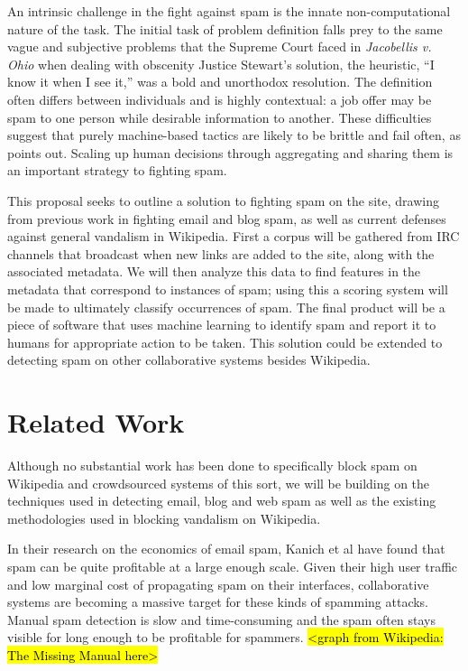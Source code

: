 \documentclass[letterpaper]{sig-alternate}
\begin{document}
An intrinsic challenge in the fight against spam is the innate non-computational nature of the task. The initial task of problem definition falls prey to the same vague and subjective problems that the Supreme Court faced in \emph{Jacobellis v. Ohio} when dealing with obscenity Justice Stewart's solution, the heuristic, ``I know it when I see it,'' was a bold and unorthodox resolution. The definition often differs between individuals and is highly contextual: a job offer may be spam to one person while desirable information to another. These difficulties suggest that purely machine-based tactics are likely to be brittle and fail often, as \cite{collaborative_filtering} points out. Scaling up human decisions through aggregating and sharing them is an important strategy to fighting spam.

This proposal seeks to outline a solution to fighting spam on the site, drawing from previous work in fighting email and blog spam, as well as current defenses against general vandalism in Wikipedia. First a corpus will be gathered from IRC channels that broadcast when new links are added to the site, along with the associated metadata. We will then analyze this data to find features in the metadata that correspond to instances of spam; using this a scoring system will be made to ultimately classify occurrences of spam. The final product will be a piece of software that uses machine learning to identify spam and report it to humans for appropriate action to be taken. This solution could be extended to detecting spam on other collaborative systems besides Wikipedia.

\section{Related Work}
\label{sec:related_work}
Although no substantial work has been done to specifically block spam on Wikipedia and crowdsourced systems of this sort, we will be building on the techniques used in detecting email, blog and web spam as well as the existing methodologies used in blocking vandalism on Wikipedia. 

In their research on the economics of email spam, Kanich et al \cite{spamalytics} have found that spam can be quite profitable at a large enough scale. Given their high user traffic and low marginal cost of propagating spam on their interfaces, collaborative systems are becoming a massive target for these kinds of spamming attacks. Manual spam detection is slow and time-consuming and the spam often stays visible for long enough to be profitable for spammers.
 \hl{<graph from Wikipedia: The Missing Manual here>}
\end{document}
